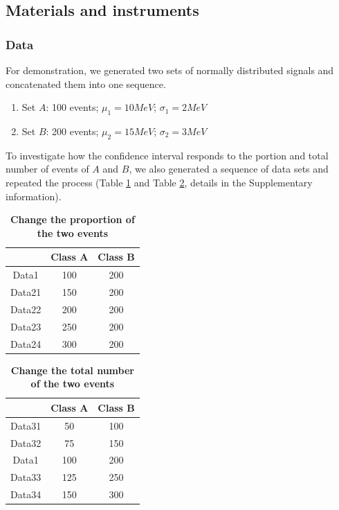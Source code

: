 \documentclass[10pt,a4paper,twocolumn,twoside,UTF8]{article}
\begin{document}
		
	\subsection{Materials and instruments}
		\subsubsection{Data}
		For demonstration, we generated two sets of normally distributed signals and concatenated them into one sequence. 
		\begin{enumerate}[label=\arabic*.]
			\item Set $A$: 100 events; $\mu_1= 10MeV$; $\sigma_1 = 2MeV$
			\item Set $B$: 200 events; $\mu_2= 15MeV$; $\sigma_2 = 3MeV$
		\end{enumerate}

		To investigate how the confidence interval responds to the portion and total number of events of $A$ and $B$, 
		we also generated a sequence of data sets and repeated the process (Table \ref{tab:0.1} and Table \ref{tab:0.2}, details in the Supplementary information). 
		\begin{table}[htbp]
			\centering
				\begin{tabular}{ccc}
					\toprule
						        &Class A	&Class B    \\
					\midrule
					Data1  	&100	    &200	    \\					
					Data21	&150	    &200	    \\		
					Data22	&200	    &200	    \\			
					Data23	&250	    &200	    \\
					Data24	&300	    &200	    \\
					\bottomrule
				\end{tabular}
				\caption{\textbf{Change the proportion of the two events}}
				\label{tab:0.1}
		\end{table}

		\begin{table}[htbp]
			\centering
				\begin{tabular}{ccc}
					\toprule
						        &Class A	&Class B    \\
					\midrule
					Data31	&50 	    &100	    \\	
					Data32	&75 	    &150	    \\
					Data1  	&100	    &200	    \\					
					Data33	&125	    &250	    \\
					Data34	&150	    &300	    \\
					\bottomrule
				\end{tabular}
				\caption{\textbf{Change the total number of the two events}}
				\label{tab:0.2}
		\end{table}
\end{document}

